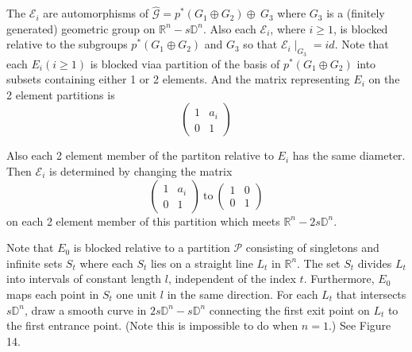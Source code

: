 The $\mathcal{E}_i$ are automorphisms of $\hat{\mathcal{G}}= p^* (G_1
\oplus G_2) \oplus~ G_3$ where $G_3$ is a (finitely generated)
geometric group on $\mathbb{R}^n- s\mathbb{D}^n$. Also each
$\mathcal{E}_i$, where $i \geq 1$, is blocked relative to the
subgroups $p^* (G_1 \oplus G_2)$ and $G_3$ so that
$\mathcal{E}_i\mid_{G_3}=id$. Note that each $E_i (i \geq
1)$ is blocked via\pageoriginale a partition of the basis of $p^* (G_1
\oplus G_2)$ into subsets containing either 1 or 2 elements. And the
matrix representing $E_i$ on the 2 element partitions is 
$$
\begin{pmatrix}
  1 & a_i\\
  0 & 1
\end{pmatrix}
$$

Also each 2 element member of the partiton relative to $E_i$ has the
same diameter. Then $\mathcal{E}_i$ is determined by changing the
matrix
$$
\begin{pmatrix}
  1 & a_i\\
  0 & 1
\end{pmatrix}~\text{to}~
\begin{pmatrix}
  1 & 0\\
  0 & 1
\end{pmatrix}
$$
on each 2 element member of this partition which meets $\mathbb{R}^n -
2 s \mathbb{D}^n$.

Note that $E_0$ is blocked relative to a partition $\mathcal{P}$
consisting of singletons and infinite sets $S_t$ where each $S_t$ lies
on a straight line $L_t$ in $\mathbb{R}^n$. The set $S_t$ divides
$L_t$ into intervals of constant length $l$, independent of the index
$t$. Furthermore, $E_0$ maps each point in $S_t$ one unit $l$ in the
same direction. For each $L_t$ that intersects $s\mathbb{D}^n$,
draw a smooth curve in $2s\mathbb{D}^n-s\mathbb{D}^{n}$ 
connecting the first exit
point on $L_t$ to the first entrance point. (Note this is impossible
to do when $n=1$.) See Figure 14.
\begin{figure}[H]
\end{figure}

